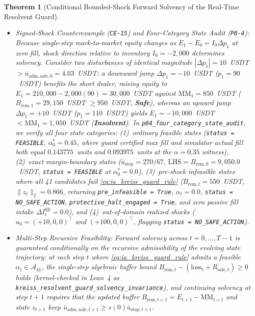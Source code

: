 \documentclass[12pt]{article}
\newtheorem{theorem}{Theorem}[section]
\theoremstyle{definition}
\theoremstyle{remark}
\begin{document}
\begin{theorem}[Conditional Bounded-Shock Forward Solvency of the Real-Time Resolvent Guard]
\begin{enumerate}
\begin{itemize}
\item \emph{Signed-Shock Counterexample (\texttt{CE-15}) and Four-Category State Audit (\texttt{P0-4}):} Because single-step mark-to-market equity changes as $E_1 - E_0 = I_0 \Delta p_1$ at zero fill, shock direction relative to inventory $I_0 = -2{,}000$ determines solvency. Consider two disturbances of identical magnitude $|\Delta p_1| = 10$~USDT $> \bar{u}_{\mathrm{adm,safe},0} = 4.03$~USDT: a downward jump $\Delta p_1 = -10$~USDT ($p_1 = 90$~USDT) \emph{benefits} the short dealer, raising equity to $E_1 = 210{,}000 - 2{,}000(90) = 30{,}000$~USDT against $\mathrm{MM}_1 = 850$~USDT ($B_{\mathrm{rem},1} = 29{,}150$~USDT $\ge 950$~USDT, \textbf{Safe}), whereas an upward jump $\Delta p_1 = +10$~USDT ($p_1 = 110$~USDT) yields $E_1 = -10{,}000$~USDT $< \mathrm{MM}_1 = 1{,}050$~USDT (\textbf{Insolvent}). In \texttt{p04\_four\_category\_state\_audit}, we verify all four state categories: (1)~ordinary feasible states (\texttt{status = FEASIBLE}, $\alpha^*_0 = 0.45$, where guard certified max fill and simulator actual fill both equal $0.143775$~units and $0.093975$~units at the $\alpha=0.35$ witness), (2)~exact margin-boundary states ($\bar{u}_{\mathrm{step}} = 270/67$, $\mathrm{LHS} = B_{\mathrm{rem},0} = 9{,}050.0$~USDT, \texttt{status = FEASIBLE} at $\alpha^*_0 = 0.0$), (3)~pre-shock infeasible states where all 41 candidates fail \eqref{eq:ia_kreiss_guard_rule} ($B_{\mathrm{rem},t} = 550$~USDT, $\|z_t\|_2 = 0.866$, returning \texttt{pre\_infeasible = True}, $\alpha_t = 0.0$, \texttt{status = NO\_SAFE\_ACTION}, \texttt{protective\_halt\_engaged = True}, and zero passive fill intake $\Delta I^{\mathrm{fill}}_t = 0.0$), and (4)~out-of-domain realized shocks ($u_0 = (+10, 0, 0)^\top$ and $(+100, 0, 0)^\top$, flagging \texttt{status = NO\_SAFE\_ACTION}).
\item \emph{Multi-Step Recursive Feasibility:} Forward solvency across $t = 0, \dots, T-1$ is guaranteed conditionally on the recursive admissibility of the evolving state trajectory: at each step $t$ where \eqref{eq:ia_kreiss_guard_rule} admits a feasible $\alpha_t \in \mathcal{A}_{41}$, the single-step algebraic buffer bound $B_{\mathrm{rem},t} - (\mathrm{loss}_t + R_{\mathrm{safe},t}) \ge 0$ holds (kernel-checked in Lean~4 as \nolinkurl{kreiss_resolvent_guard_solvency_invariance}), and continuing solvency at step $t+1$ requires that the updated buffer $B_{\mathrm{rem},t+1} = E_{t+1} - \mathrm{MM}_{t+1}$ and state $z_{t+1}$ keep $\bar{u}_{\mathrm{adm,safe},t+1} \ge s(0)\bar{u}_{\mathrm{step},t+1}$.
\end{itemize}

\end{enumerate}
\end{theorem}
\end{document}
